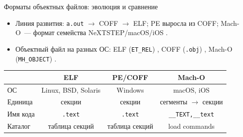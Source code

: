 \documentclass[aspectratio=169,11pt]{beamer}
\begin{document}
\begin{frame}{Форматы объектных файлов: эволюция и сравнение}
  \begin{itemize}
    \item Линия развития: \texttt{a.out} $\rightarrow$ COFF $\rightarrow$ ELF; PE выросла из COFF; Mach-O~--- формат семейства NeXTSTEP/macOS/iOS \cite{levine,pecoff,macho}.
    \item Объектный файл на разных ОС: ELF (\texttt{ET\_REL}) \cite{tis}, COFF (\texttt{.obj}) \cite{pecoff}, Mach-O (\texttt{MH\_OBJECT}) \cite{macho}.
  \end{itemize}
  \small
  \begin{center}
    \begin{tabularx}{0.90\textwidth}{lCCC}
      \toprule
                & ELF \cite{tis}       & PE/COFF \cite{pecoff} & Mach-O \cite{macho}        \\
      \midrule
      ОС        & Linux, BSD, Solaris  & Windows               & macOS, iOS                 \\
      Единица   & секции               & секции                & сегменты $\to$ секции      \\
      Имя кода  & \texttt{.text}       & \texttt{.text}        & \texttt{\_\_TEXT,\_\_text} \\
      Каталог   & таблица секций       & таблица секций        & load commands              \\
      \bottomrule
    \end{tabularx}
  \end{center}
\end{frame}
\end{document}
